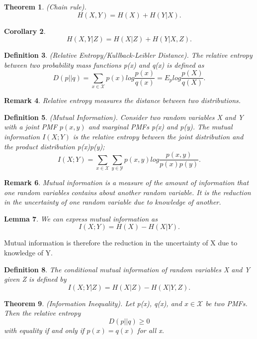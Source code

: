 \documentclass[twoside]{article}
\newcounter{lecnum}
\newtheorem{theorem}{Theorem}[lecnum]
\newtheorem{lemma}[theorem]{Lemma}
\newtheorem{corollary}[theorem]{Corollary}
\newtheorem{definition}[theorem]{Definition}
\newtheorem{remark}[theorem]{Remark}
\begin{document}
\begin{theorem}(Chain rule). 
$$
H(X,Y) = H(X) + H(Y|X).
$$
\end{theorem}

\begin{corollary}
$$
H(X,Y|Z) = H(X|Z) + H(Y|X,Z).
$$
\end{corollary}

\begin{definition}(Relative Entropy/Kullback-Leibler Distance). The relative entropy between two probability mass functions p(x) and q(x) is defined as 
$$
D(p||q) = \sum_{x \in \mathcal{X}}p(x)log\frac{p(x)}{q(x)} = E_plog\frac{p(X)}{q(X)}.
$$
\end{definition}

\begin{remark}Relative entropy measures the distance between two distributions.
\end{remark}

\begin{definition}(Mutual Information). Consider two random variables X and Y with a joint PMF $p(x,y)$ and marginal PMFs p(x) and p(y). The mutual information $I(X;Y)$ is the relative entropy between the joint distribution and the product distribution p(x)p(y);
$$
I(X;Y) = \sum_{x \in \mathcal{X}}\sum_{y \in \mathcal{Y}}p(x,y)log\frac{p(x,y)}{p(x)p(y)}.
$$
\end{definition}

\begin{remark}Mutual information is a measure of the amount of information that one random variables contains about another random variable. It is the reduction in the uncertainty of one random variable due to knowledge of another.
\end{remark}

\begin{lemma}We can express mutual information as 
$$
I(X;Y) = H(X) - H(X|Y).
$$
\end{lemma}

Mutual information is therefore the reduction in the uncertainty of X due to knowledge of Y.

\begin{definition}The conditional mutual information of random variables X and Y given Z is defined by 
$$
I(X;Y|Z) = H(X|Z) - H(X|Y,Z).
$$
\end{definition}

\begin{theorem}(Information Inequality). Let p(x), q(x), and $x \in \mathcal{X}$ be two PMFs. Then the relative entropy
$$
D(p||q) \geq 0
$$
with equality if and only if $p(x) = q(x)$ for all x.
\end{theorem}
\end{document}
